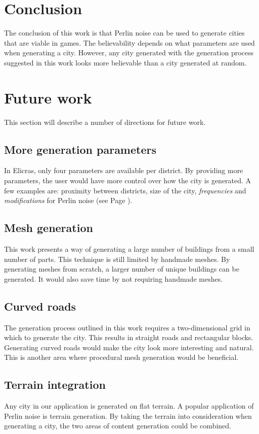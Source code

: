 \section{Conclusion}
The conclusion of this work is that Perlin noise can be used to generate cities that are viable in games. The believability depends on what parameters are used when generating a city. However, any city generated with the generation process suggested in this work looks more believable than a city generated at random.
	
\section{Future work}
This section will describe a number of directions for future work.
	
	\subsection{More generation parameters}
	In Elicras, only four parameters are available per district. By providing more parameters, the user would have more control over how the city is generated. A few examples are: proximity between districts, size of the city, \textit{frequencies} and \textit{modifications} for Perlin noise (see Page \pageref{fig:normal-and-modified-perlin}).
	
	\subsection{Mesh generation}
	This work presents a way of generating a large number of buildings from a small number of parts. This technique is still limited by handmade meshes. By generating meshes from scratch, a larger number of unique buildings can be generated. It would also save time by not requiring handmade meshes.
		
	\subsection{Curved roads}
	The generation process outlined in this work requires a two-dimensional grid in which to generate the city. This results in straight roads and rectangular blocks. Generating curved roads would make the city look more interesting and natural. This is another area where procedural mesh generation would be beneficial.
		
	\subsection{Terrain integration}
	Any city in our application is generated on flat terrain. A popular application of Perlin noise is terrain generation. By taking the terrain into consideration when generating a city, the two areas of content generation could be combined.